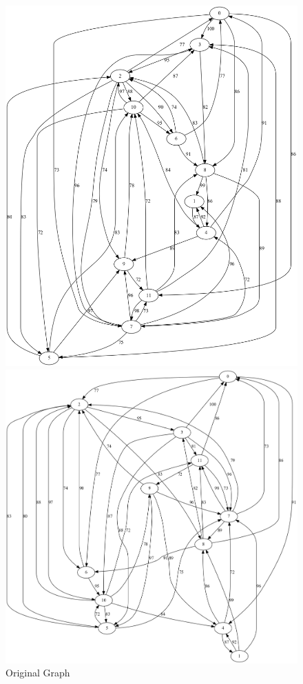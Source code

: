 \documentclass{article}
\begin{document}
\begin{figure}[!htb]
  \includegraphics[width=\linewidth]{"./output/scc_example12.png"}
  \caption{Original Graph}
\endminipage\hfill
{}
  \includegraphics[width=\linewidth]{"./output/scc_example12_inv.png"}

\end{figure}
\end{document}
